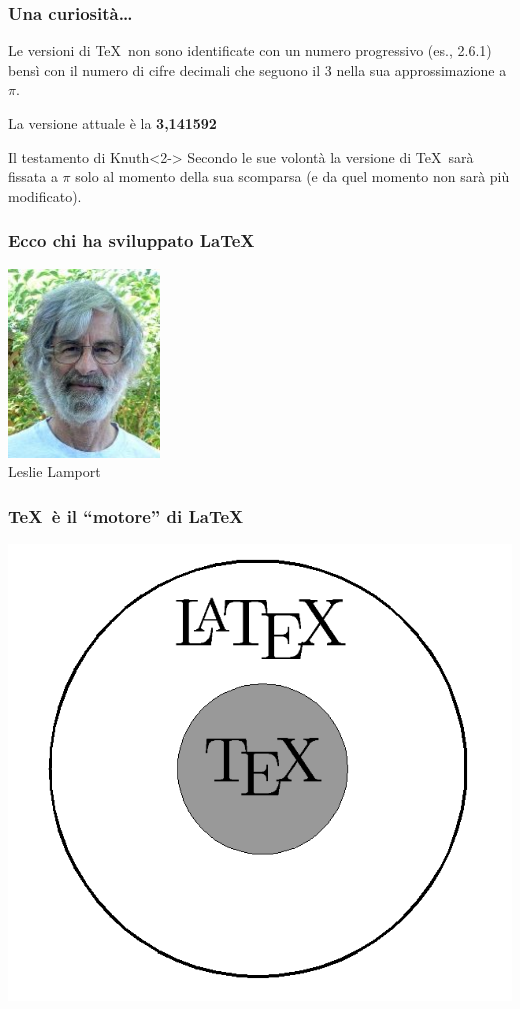 \documentclass[svgnames,%
	ucs,%
	pdftex]{guitbeamer}
\begin{document}
\begin{frame}
  \frametitle{Una curiosit\`a\dots}
	Le versioni di \TeX\ non sono identificate con un numero progressivo 
	(es., 2.6.1) bens\`i con il numero di cifre decimali che
	seguono il 3 nella sua approssimazione a $\pi$.
	\begin{center}
		La versione attuale \`e la \textbf{3,141592}
	\end{center}
  \bigskip 
	\begin{block}{Il testamento di Knuth}<2->
	Secondo le sue volont\`a la versione di \TeX\ sar\`a fissata a $\pi$ solo
	al momento della sua scomparsa (e da quel momento non sar\`a pi\`u
	modificato).
	\end{block}
\end{frame}
\begin{frame}
  \frametitle{Ecco chi ha sviluppato \LaTeX}
	\begin{center}
		\includegraphics[height=5cm]{leslie}\\[2mm]
		\large Leslie Lamport
	\end{center}
\end{frame}
\begin{frame}
  \frametitle{\TeX\ \`e il ``motore'' di \LaTeX}
	\begin{center}
		\includegraphics[scale=.4]{texlatex}%
	\end{center}
\end{frame}
\end{document}
